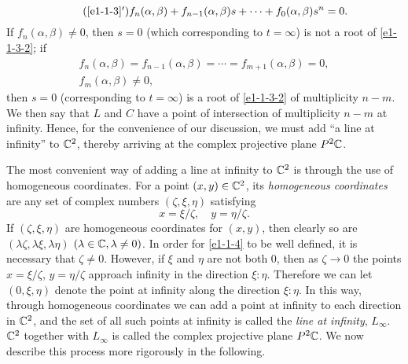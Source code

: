 \begin{equation}\label{e1-1-3-2}\tag{\ref*{e1-1-3}$'$}
    f_n(\alpha,\beta)+f_{n-1}(\alpha,\beta)s+\cdots+f_0(\alpha,\beta)s^n=0. 
\end{equation}
If $f_n(\alpha,\beta)\neq0$, then $s=0$ (which corresponding to $t=\infty$) is not a root of \eqref{e1-1-3-2}; if 
\begin{gather*}
    f_n(\alpha,\beta)=f_{n-1}(\alpha,\beta)=\cdots=f_{m+1}(\alpha,\beta)=0, \\
    f_m(\alpha,\beta)\neq0, 
\end{gather*}
then $s=0$ (corresponding to $t=\infty$) is a root of \eqref{e1-1-3-2} of multiplicity $n-m$. We then say that $L$ and $C$ have a point of intersection of multiplicity $n-m$ at infinity. Hence, for the convenience of our discussion, we must add ``a line at infinity'' to $\mathbb{C}^2$, thereby arriving at the complex projective plane $P^2\mathbb{C}$. 

The most convenient way of adding a line at infinity to $\mathbb{C}^2$ is through the use of homogeneous coordinates. For a point $(x,y)\in\mathbb{C}^2$, its \textit{homogeneous coordinates} are any set of complex numbers $(\zeta,\xi,\eta)$ satisfying 
\begin{equation}\label{e1-1-4}
    x=\xi/\zeta, \quad y=\eta/\zeta. 
\end{equation}
If $(\zeta,\xi,\eta)$ are homogeneous coordinates for $(x,y)$, then clearly so are $(\lambda\zeta,\lambda\xi,\lambda\eta)$ $(\lambda\in\mathbb{C},\lambda\neq0)$. In order for \eqref{e1-1-4} to be well defined, it is necessary that $\zeta\neq0$. However, if $\xi$ and $\eta$ are not both $0$, then as $\zeta\to0$ the points $x=\xi/\zeta$, $y=\eta/\zeta$ approach infinity in the direction $\xi:\eta$. Therefore we can let $(0,\xi,\eta)$ denote the point at infinity along the direction $\xi:\eta$. In this way, through homogeneous coordinates we can add a point at infinity to each direction in $\mathbb{C}^2$, and the set of all such points at infinity is called the \textit{line at infinity}, $L_\infty$. $\mathbb{C}^2$ together with $L_\infty$ is called the complex projective plane $P^2\mathbb{C}$. We now describe this process more rigorously in the following. 

